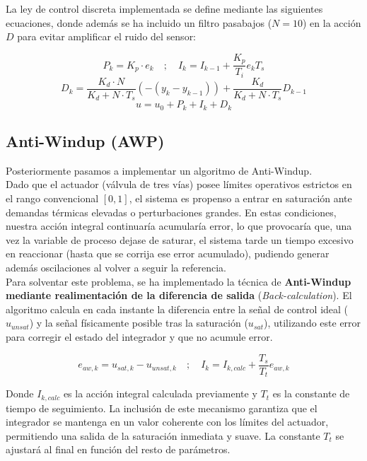 \documentclass[12pt,a4paper]{article}
\begin{document}
	La ley de control discreta implementada se define mediante las siguientes ecuaciones, donde además se ha incluido un filtro pasabajos ($N=10$) en la acción $D$ para evitar amplificar el ruido del sensor:
	
	\begin{equation}
		P_k = K_p \cdot e_k \quad ; \quad I_k = I_{k-1} + \frac{K_p}{T_i} e_k T_s
	\end{equation}
	\begin{equation}
		D_k = \frac{K_d \cdot N}{K_d + N \cdot T_s} \left( - \left( y_k - y_{k-1} \right) \right) + \frac{K_d}{K_d + N \cdot T_s} D_{k-1}
	\end{equation}
	\begin{equation}
		u = u_0 + P_k + I_k + D_k
	\end{equation}
	
	\subsection{Anti-Windup (AWP)}
	Posteriormente pasamos a implementar un algoritmo de Anti-Windup. \\
	
	Dado que el actuador (válvula de tres vías) posee límites operativos estrictos en el rango convencional $[0, 1]$, el sistema es propenso a entrar en saturación ante demandas térmicas elevadas o perturbaciones grandes. En estas condiciones, nuestra acción integral  continuaría acumularía error, lo que provocaría que, una vez la variable de proceso dejase de saturar, el sistema tarde un tiempo excesivo en reaccionar (hasta que se corrija ese error acumulado), pudiendo generar además oscilaciones al volver a seguir la referencia.\\
	
	Para solventar este problema, se ha implementado la técnica de \textbf{Anti-Windup mediante realimentación de la diferencia de salida} (\textit{Back-calculation}). El algoritmo calcula en cada instante la diferencia entre la señal de control ideal ($u_{unsat}$) y la señal físicamente posible tras la saturación ($u_{sat}$), utilizando este error para corregir el estado del integrador y que no acumule error.
	
	
	\begin{equation}
		e_{aw,k} = u_{sat,k} - u_{unsat,k} \quad ; \quad I_{k} = I_{k,calc} + \frac{T_s}{T_t} e_{aw,k}
	\end{equation}
	
	Donde $I_{k,calc}$ es la acción integral calculada previamente y $T_t$ es la constante de tiempo de seguimiento. La inclusión de este mecanismo garantiza que el integrador se mantenga en un valor coherente con los límites del actuador, permitiendo una salida de la saturación inmediata y suave. La constante $T_t$ se ajustará al final en función del resto de parámetros. 
	
\end{document}
